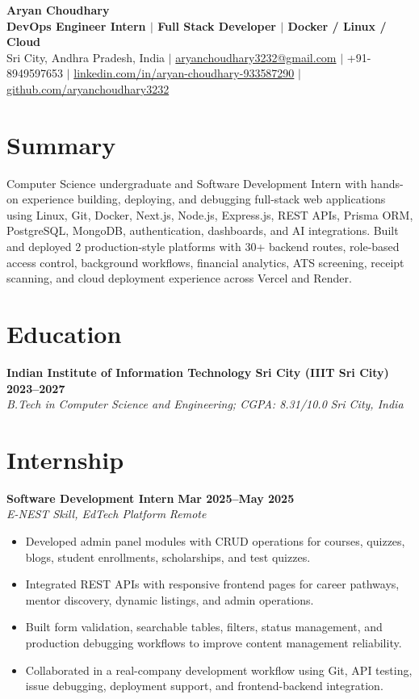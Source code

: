 \documentclass[10pt,a4paper]{article}
\newcommand{\resumeItem}[1]{\item\small #1}
\newcommand{\resumeSubheading}[4]{%
  \textbf{#1} \hfill \textbf{\small #2}\\
  \textit{\small #3} \hfill \textit{\small #4}
}
\begin{document}
\begin{center}
  {\LARGE \textbf{Aryan Choudhary}}\\
  \vspace{2pt}
\textbf{\small DevOps Engineer Intern $|$ Full Stack Developer $|$ Docker / Linux / Cloud}\\
  \vspace{3pt}
  \small
  Sri City, Andhra Pradesh, India $|$
  \href{mailto:aryanchoudhary3232@gmail.com}{aryanchoudhary3232@gmail.com} $|$
  +91-8949597653 $|$
  \href{https://www.linkedin.com/in/aryan-choudhary-933587290/}{linkedin.com/in/aryan-choudhary-933587290} $|$
  \href{https://github.com/aryanchoudhary3232}{github.com/aryanchoudhary3232}
\end{center}

\section{Summary}
\small
Computer Science undergraduate and Software Development Intern with hands-on experience building, deploying, and debugging full-stack web applications using Linux, Git, Docker, Next.js, Node.js, Express.js, REST APIs, Prisma ORM, PostgreSQL, MongoDB, authentication, dashboards, and AI integrations. Built and deployed 2 production-style platforms with 30+ backend routes, role-based access control, background workflows, financial analytics, ATS screening, receipt scanning, and cloud deployment experience across Vercel and Render.

\section{Education}
\resumeSubheading
  {Indian Institute of Information Technology Sri City (IIIT Sri City)}
  {2023--2027}
  {B.Tech in Computer Science and Engineering; CGPA: 8.31/10.0}
  {Sri City, India}

\section{Internship}
\resumeSubheading
  {Software Development Intern}
  {Mar 2025--May 2025}
  {E-NEST Skill, EdTech Platform}
  {Remote}
\begin{itemize}[leftmargin=*, topsep=2pt, itemsep=2pt]
  \resumeItem{Developed admin panel modules with CRUD operations for courses, quizzes, blogs, student enrollments, scholarships, and test quizzes.}
  \resumeItem{Integrated REST APIs with responsive frontend pages for career pathways, mentor discovery, dynamic listings, and admin operations.}
  \resumeItem{Built form validation, searchable tables, filters, status management, and production debugging workflows to improve content management reliability.}
  \resumeItem{Collaborated in a real-company development workflow using Git, API testing, issue debugging, deployment support, and frontend-backend integration.}
\end{itemize}
\end{document}
